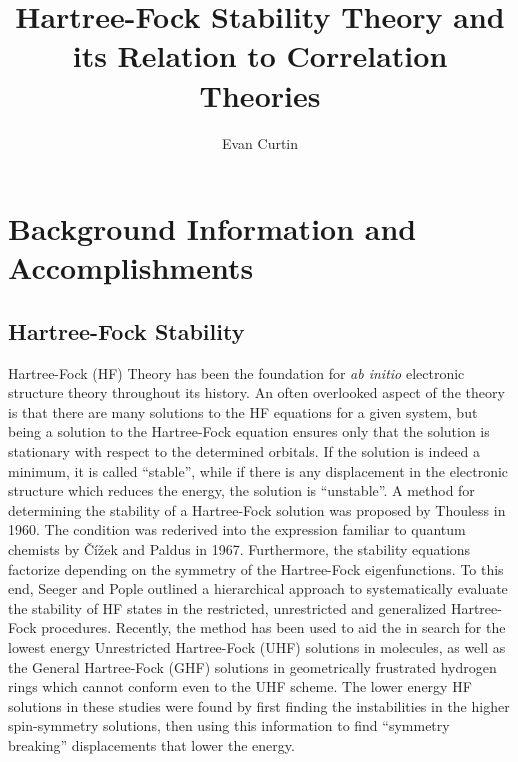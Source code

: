 \documentclass{revtex4}
\begin{document}
\title{Hartree-Fock Stability Theory and its Relation to Correlation Theories}
\author{Evan Curtin}
\maketitle


\section{Background Information and Accomplishments}

   
   \subsection{Hartree-Fock Stability}
    Hartree-Fock (HF) Theory has been the foundation for \emph{ab initio} electronic structure 
    theory 
    throughout its history. An often overlooked aspect of the theory is that there are many 
    solutions to the HF equations for a given system, but being a 
    solution to the Hartree-Fock equation ensures only that the solution is stationary with respect 
    to the 
    determined orbitals. If the solution is indeed a minimum, it is called ``stable'', while if 
    there 
    is any displacement in the electronic structure which reduces the energy, the solution is 
    ``unstable''. A method for determining the stability of a Hartree-Fock solution was 
    proposed by Thouless in 1960\cite{Thouless1960}. The condition was rederived into the 
    expression familiar to quantum chemists by Čížek and Paldus in 1967\cite{Cizek1967}. 
    Furthermore, the stability equations factorize depending on the symmetry of the Hartree-Fock 
    eigenfunctions. To this end, Seeger and Pople outlined a hierarchical approach to 
    systematically evaluate the stability of HF states in the restricted, unrestricted and 
    generalized Hartree-Fock procedures\cite{Seeger1977}. Recently, the method has been used to aid 
    the in search for the lowest energy Unrestricted Hartree-Fock (UHF) solutions in molecules, as 
    well as the General Hartree-Fock (GHF) solutions in geometrically frustrated hydrogen rings 
    which cannot conform even to the UHF scheme\cite{Pulay2016, Goings2015}. The lower energy HF 
    solutions in these studies were found by first finding the instabilities in the higher 
    spin-symmetry solutions, then using this information to find ``symmetry breaking'' 
    displacements that lower the energy.
    
\end{document}
